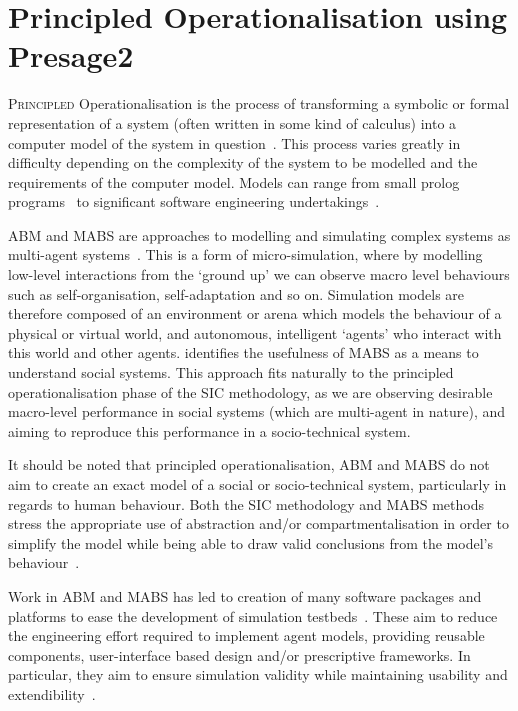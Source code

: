 \acresetall
\chapter{Principled Operationalisation using Presage2}\label{ch:presage}

\lettrine[lines=3]{P}{rincipled} Operationalisation is the process of transforming a symbolic or formal representation of a system (often written in some kind of calculus) into a computer model of the system in question~\citep{Jones2013}. This process varies greatly in difficulty depending on the complexity of the system to be modelled and the requirements of the computer model.  Models can range from small prolog programs~\citep{Pitt2005a} to significant software engineering undertakings~\citep{Timm2005}.

\ac{ABM} and \ac{MABS} are approaches to modelling and simulating complex systems as multi-agent systems~\citep{Macal2010,Moss2001}.
This is a form of micro-simulation, where by modelling low-level interactions from the `ground up' we can observe macro level behaviours such as self-organisation, self-adaptation and so on.
Simulation models are therefore composed of an environment or arena which models the behaviour of a physical or virtual world, and autonomous, intelligent `agents' who interact with this world and other agents. 
\citet{Axelrod1997} identifies the usefulness of \ac{MABS} as a means to understand social systems. 
This approach fits naturally to the principled operationalisation phase of the \ac{SIC} methodology, as we are observing desirable macro-level performance in social systems (which are multi-agent in nature), and aiming to reproduce this performance in a socio-technical system. 

It should be noted that principled operationalisation, \ac{ABM} and \ac{MABS} do not aim to create an exact model of a social or socio-technical system, particularly in regards to human behaviour. Both the \ac{SIC} methodology and \ac{MABS} methods stress the appropriate use of abstraction and/or compartmentalisation in order to simplify the model while being able to draw valid conclusions from the model's behaviour~\citep{Edmonds2001}.

Work in \ac{ABM} and \ac{MABS} has led to creation of many software packages and platforms to ease the development of simulation testbeds~\citep{CynthiaNikolaiandGregoryMadey2009}. These aim to reduce the engineering effort required to implement agent models, providing reusable components, user-interface based design and/or prescriptive frameworks. In particular, they aim to ensure simulation validity while maintaining usability and extendibility~\citep{Axelrod1997}.

